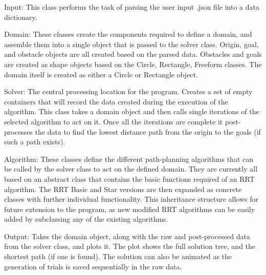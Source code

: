 \documentclass[10pt]{article}
\begin{document}
	Input: This class performs the task of parsing the user input .json file into a data dictionary.
	
	Domain: These classes create the components required to define a domain, and assemble them into a single object that is passed to the solver class. Origin, goal, and obstacle objects are all created based on the parsed data. Obstacles and goals are created as shape objects based on the Circle, Rectangle, Freeform classes. The domain itself is created as either a Circle or Rectangle object.
	
	Solver: The central processing location for the program. Creates a set of empty containers that will record the data created during the execution of the algorithm. This class takes a domain object and then calls single iterations of the selected algorithm to act on it. Once all the iterations are complete it post-processes the data to find the lowest distance path from the origin to the goals (if such a path exists).
	
	Algorithm: These classes define the different path-planning algorithms that can be called by the solver class to act on the defined domain. They are currently all based on an abstract class that contains the basic functions required of an RRT algorithm. The RRT Basic and Star versions are then expanded as concrete classes with further individual functionality. This inheritance structure allows for future extension to the program, as new modified RRT algorithms can be easily added by subclassing any of the existing algorithms.
	
	Output: Takes the domain object, along with the raw and post-processed data from the solver class, and plots it. The plot shows the full solution tree, and the shortest path (if one is found). The solution can also be animated as the generation of trials is saved sequentially in the raw data.
	
	
	
\end{document}
